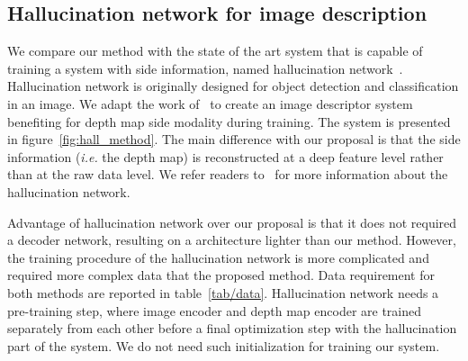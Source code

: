 %

\subsection{Hallucination network for image description}
\label{subsec:hall}
We compare our method with the state of the art system that is capable of training a system with side information, named hallucination network~\cite{Hoffman2016}. Hallucination network is originally designed for object detection and classification in an image. We adapt the work of~\cite{Hoffman2016} to create an image descriptor system benefiting for depth map side modality during training. The system is presented in figure~\ref{fig:hall_method}. The main difference with our proposal is that the side information (\textit{i.e.} the depth map) is reconstructed at a deep feature level rather than at the raw data level. We refer readers to~\cite{Hoffman2016} for more information about the hallucination network.

Advantage of hallucination network over our proposal is that it does not required a decoder network, resulting on a architecture lighter than our method. However, the training procedure of the hallucination network is more complicated and required more complex data that the proposed method. Data requirement for both methods are reported in table~\ref{tab/data}. Hallucination network needs a pre-training step, where image encoder and depth map encoder are trained separately from each other before a final optimization step with the hallucination part of the system. We do not need such initialization for training our system.


